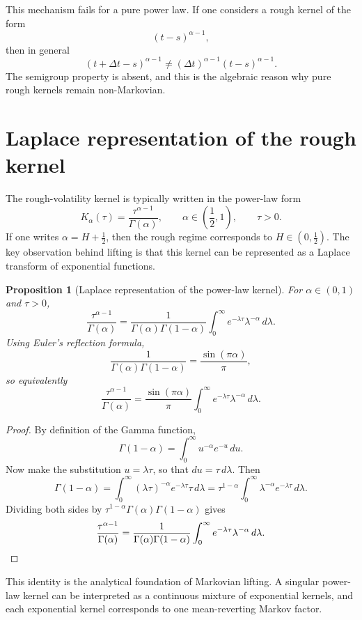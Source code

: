 \documentclass[a4paper,10pt,titlepage,oneside,openany]{book}
\theoremstyle{plain}
\newtheorem{proposition}{Proposition}[chapter]
\theoremstyle{definition}
\theoremstyle{remark}
\newcommand{\1}{\mathbf{1}}
\begin{document}
This mechanism fails for a pure power law. If one considers a rough kernel of the form
\[
(t-s)^{\alpha-1},
\]
then in general
\[
(t+\Delta t-s)^{\alpha-1}
\neq
(\Delta t)^{\alpha-1}(t-s)^{\alpha-1}.
\]
The semigroup property is absent, and this is the algebraic reason why pure rough kernels remain non-Markovian.

\section{Laplace representation of the rough kernel}

The rough-volatility kernel is typically written in the power-law form
\[
K_\alpha(\tau)=\frac{\tau^{\alpha-1}}{\Gamma(\alpha)},
\qquad
\alpha\in\left(\frac12,1\right),
\qquad
\tau>0.
\]
If one writes \(\alpha=H+\tfrac12\), then the rough regime corresponds to \(H\in(0,\tfrac12)\). The key observation behind lifting is that this kernel can be represented as a Laplace transform of exponential functions.

\begin{proposition}[Laplace representation of the power-law kernel]
For \(\alpha\in(0,1)\) and \(\tau>0\),
\[
\frac{\tau^{\alpha-1}}{\Gamma(\alpha)}
=
\frac{1}{\Gamma(\alpha)\Gamma(1-\alpha)}
\int_0^\infty e^{-\lambda \tau}\lambda^{-\alpha}\,d\lambda.
\]
Using Euler's reflection formula,
\[
\frac{1}{\Gamma(\alpha)\Gamma(1-\alpha)}
=
\frac{\sin(\pi\alpha)}{\pi},
\]
so equivalently
\[
\frac{\tau^{\alpha-1}}{\Gamma(\alpha)}
=
\frac{\sin(\pi\alpha)}{\pi}
\int_0^\infty e^{-\lambda \tau}\lambda^{-\alpha}\,d\lambda.
\]
\end{proposition}

\begin{proof}
By definition of the Gamma function,
\[
\Gamma(1-\alpha)=\int_0^\infty u^{-\alpha}e^{-u}\,du.
\]
Now make the substitution \(u=\lambda \tau\), so that \(du=\tau\,d\lambda\). Then
\[
\Gamma(1-\alpha)
=
\int_0^\infty (\lambda\tau)^{-\alpha}e^{-\lambda\tau}\tau\,d\lambda
=
\tau^{1-\alpha}\int_0^\infty \lambda^{-\alpha}e^{-\lambda\tau}\,d\lambda.
\]
Dividing both sides by \(\tau^{1-\alpha}\Gamma(\alpha)\Gamma(1-\alpha)\) gives
\[
\frac{\tau^{\alpha-1}}{\Gamma(\alpha)}
=
\frac{1}{\Gamma(\alpha)\Gamma(1-\alpha)}
\int_0^\infty e^{-\lambda\tau}\lambda^{-\alpha}\,d\lambda.
\qedhere
\]
\end{proof}

This identity is the analytical foundation of Markovian lifting. A singular power-law kernel can be interpreted as a continuous mixture of exponential kernels, and each exponential kernel corresponds to one mean-reverting Markov factor.
\end{document}
